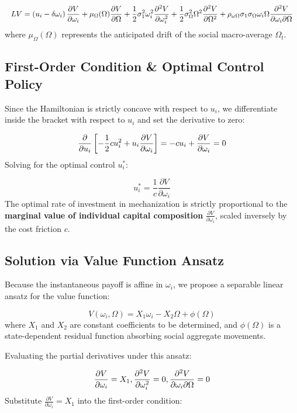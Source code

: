 \documentclass[11pt,letterpaper]{report}
\newcommand{\fitmath}[1]{\begingroup\setbox0=\hbox{$\displaystyle #1$}\ifdim\wd0>\linewidth\resizebox{\linewidth}{!}{$\displaystyle #1$}\else\displaystyle #1\fi\endgroup}
\begin{document}
\[\fitmath{LV=\left({{u}_{i}-\delta {\omega }_{i}}\right)\frac{\partial V}{\partial {\omega }_{i}}+{\mu }_{\Omega }(\Omega )\frac{\partial V}{\partial \Omega }+\frac{1}{2}{\sigma }_{1}^{2}{\omega }_{i}^{2}\frac{{\partial }^{2}V}{\partial {\omega }_{i}^{2}}+\frac{1}{2}{\sigma }_{\Omega }^{2}{\Omega }^{2}\frac{{\partial }^{2}V}{\partial {\Omega }^{2}}+{\rho }_{\omega \Omega }{\sigma }_{1}{\sigma }_{\Omega }{\omega }_{i}\Omega \frac{{\partial }^{2}V}{\partial {\omega }_{i}\partial \Omega }}\]
where ${\mu }_{\Omega }(\Omega )$ represents the anticipated drift of the social macro-average ${\Omega }_{t}$.

\subsection{First-Order Condition \& Optimal Control Policy}
Since the Hamiltonian is strictly concave with respect to ${u}_{i}$, we differentiate inside the bracket with respect to ${u}_{i}$ and set the derivative to zero:

\[\fitmath{\frac{\partial }{\partial {u}_{i}}\left[{-\frac{1}{2}c{u}_{i}^{2}+{u}_{i}\frac{\partial V}{\partial {\omega }_{i}}}\right]=-c{u}_{i}+\frac{\partial V}{\partial {\omega }_{i}}=0}\]
Solving for the optimal control ${u}_{i}^{*}$:

\[
{u}_{i}^{*}=\frac{1}{c}\frac{\partial V}{\partial {\omega }_{i}}
\]
The optimal rate of investment in mechanization is strictly proportional to the \textbf{marginal value of individual capital composition} $\frac{\partial V}{\partial {\omega }_{i}}$, scaled inversely by the cost friction $c$.

\subsection{Solution via Value Function Ansatz}
Because the instantaneous payoff is affine in ${\omega }_{i}$, we propose a separable linear ansatz for the value function:

\[
V({\omega }_{i},\Omega )={X}_{1}{\omega }_{i}-{X}_{2}\Omega +\phi (\Omega )
\]
where ${X}_{1}$ and ${X}_{2}$ are constant coefficients to be determined, and $\phi (\Omega )$ is a state-dependent residual function absorbing social aggregate movements.

Evaluating the partial derivatives under this ansatz:

\[\fitmath{\frac{\partial V}{\partial {\omega }_{i}}={X}_{1},\frac{{\partial }^{2}V}{\partial {\omega }_{i}^{2}}=0,\frac{{\partial }^{2}V}{\partial {\omega }_{i}\partial \Omega }=0}\]
Substitute $\frac{\partial V}{\partial {\omega }_{i}}={X}_{1}$ into the first-order condition:
\end{document}
